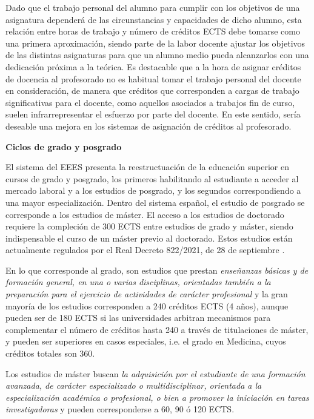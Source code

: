 \documentclass[a4paper,12pt,twoside]{article}
\begin{document}
Dado que el trabajo personal del alumno para cumplir con los objetivos de una asignatura dependerá de las circunstancias y capacidades de dicho alumno, esta relación entre horas de trabajo y número de créditos ECTS debe tomarse como una primera aproximación, siendo parte de la labor docente ajustar los objetivos de las distintas asignaturas para que un alumno medio pueda alcanzarlos con una dedicación próxima a la teórica. Es destacable que a la hora de asignar créditos de docencia al profesorado no es habitual tomar el trabajo personal del docente en consideración, de manera que créditos que corresponden a cargas de trabajo significativas para el docente, como aquellos asociados a trabajos fin de curso, suelen infrarrepresentar el esfuerzo por parte del docente. En este sentido, sería deseable una mejora en los sistemas de asignación de créditos al profesorado.

\textbf{Ciclos de grado y posgrado}

El sistema del EEES presenta la reestructuación de la educación superior en cursos de grado y posgrado, los primeros habilitando al estudiante a acceder al mercado laboral y a los estudios de posgrado, y los segundos correspondiendo a una mayor especialización. Dentro del sistema español, el estudio de posgrado se corresponde a los estudios de máster. El acceso a los estudios de doctorado requiere la compleción de 300 ECTS entre estudios de grado y máster, siendo indispensable el curso de un máster previo al doctorado. Estos estudios están actualmente regulados por el Real Decreto 822/2021, de 28 de septiembre \cite{dec_master}.

En lo que corresponde al grado, son estudios que prestan \textit{enseñanzas básicas y de formación general, en una o varias disciplinas, orientadas
también a la preparación para el ejercicio de actividades de carácter profesional} y la gran mayoría de los estudios corresponden a 240 créditos ECTS (4 años), aunque pueden ser de 180 ECTS si las universidades arbitran mecanismos para complementar el número de créditos hasta 240 a través de titulaciones de máster, y pueden ser superiores en casos especiales, i.e. el grado en Medicina, cuyos créditos totales son 360.

Los estudios de máster buscan \textit{la adquisición por el estudiante de una formación avanzada, de carácter
especializado o multidisciplinar, orientada a la especialización académica o profesional, o
bien a promover la iniciación en tareas investigadoras} y pueden corresponderse a 60, 90 ó 120 ECTS.
\end{document}
